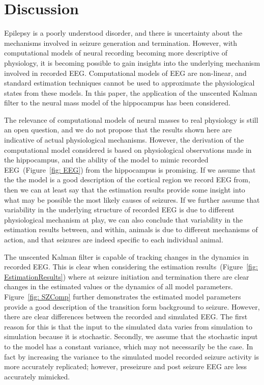 \section{Discussion}

Epilepsy is a poorly understood disorder, and there is uncertainty about the mechanisms involved in seizure generation and termination. However, with computational models of neural recording becoming more descriptive of physiology, it is becoming possible to gain insights into the underlying mechanism involved in recorded EEG. Computational models of EEG are non-linear, and standard estimation techniques cannot be used to approximate the physiological states from these models. In this paper, the application of the unscented Kalman filter to the neural mass model of the hippocampus has been considered.


The relevance of computational models of neural masses to real physiology is still an open question, and we do not propose that the results shown here are indicative of actual physiological mechanisms. However, the derivation of the computational model considered is based on physiological observations made in the hippocampus, and the ability of the model to mimic recorded EEG~(Figure~\ref{fig: EEG}) from the hippocampus is promising. If we assume that the the model is a good description of the cortical region we record EEG from, then we can at least say that the estimation results provide some insight into what may be possible the most likely causes of seizures. If we further assume that variability in the underlying structure of recorded EEG is due to different physiological mechanism at play, we can also conclude that variability in the estimation results between, and within, animals is due to different mechanisms of action, and that seizures are indeed specific to each individual animal.


The unscented Kalman filter is capable of tracking changes in the dynamics in recorded EEG. This is clear when considering the estimation results~(Figure~\ref{fig: EstimationResults}) where at seizure initiation and termination there are clear changes in the estimated values or the dynamics of all model parameters. Figure~\ref{fig: SZComp} further demonstrates the estimated model parameters provide a good description of the transition form background to seizure. However, there are clear differences between the recorded and simulated EEG. The first reason for this is that the input to the simulated data varies from simulation to simulation because it is stochastic. Secondly, we assume that the stochastic input to the model has a constant variance, which may not necessarily be the case. In fact by increasing the variance to the simulated model recorded seizure activity is  more accurately replicated; however, preseizure and post seizure EEG are less accurately mimicked.

